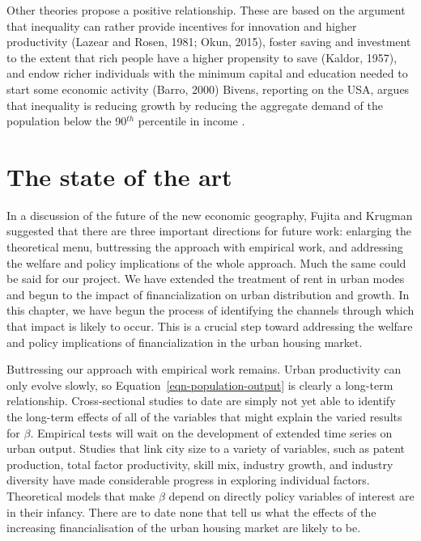  
 Other theories propose a positive relationship. These are based on the argument that inequality can rather provide incentives for innovation and higher productivity (Lazear and Rosen, 1981; Okun, 2015), foster saving and investment to the extent that rich people have a higher propensity to save (Kaldor, 1957), and endow richer individuals with the minimum capital and education needed to start some economic activity (Barro, 2000)
Bivens, reporting on the USA, argues that inequality is reducing growth by reducing the aggregate demand of the population below the 90$^{th}$ percentile in income \cite{bivensInequalitySlowingUS2017}.

\section{The state of the art}
In a discussion of the  future of the new economic geography, Fujita and Krugman suggested that there are three important directions for future work: enlarging the theoretical menu, buttressing the approach with empirical work, and addressing the welfare and policy implications of the whole approach. Much the same could be said for our project. We have extended the treatment of rent in urban modes and begun to the impact of financialization on urban distribution and growth. In this chapter, we have begun the process of identifying the channels through which  that impact is likely to occur. This is a crucial step toward  addressing the welfare and policy implications of financialization in the urban housing market.
 
Buttressing our approach with empirical work remains. Urban productivity can only evolve slowly, so Equation~\ref{eqn-population-output} is clearly a long-term relationship. Cross-sectional studies to date are simply not yet able to identify the long-term effects of all of  the variables that might explain the varied results for  $\beta$. Empirical tests will wait on the development of extended time series on urban output.
Studies that link city size to a variety of variables, such as patent production, total factor productivity, skill mix, industry growth, and industry diversity have made considerable progress in exploring individual factors. Theoretical models that make $\beta$ depend on directly policy variables of interest are in their infancy. There are to date  none that tell us what the effects of the increasing financialisation of the urban housing market are likely to be.  
 


